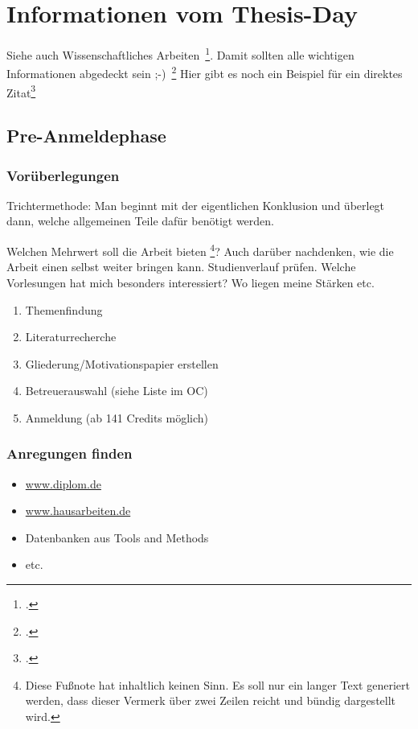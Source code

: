 \newpage
\section{Informationen vom Thesis-Day} \label{infos}
Siehe auch Wissenschaftliches Arbeiten~\footcite[\vglf][S. 1]{Balzert0.2008}. %
Damit sollten alle wichtigen Informationen abgedeckt sein ;-)~\footcite[\vglf][]{Balzert0.2008} %
Hier gibt es noch ein Beispiel für ein direktes Zitat\footcite[][]{Balzert0.2008} %

\subsection{Pre-Anmeldephase}
\subsubsection{Vorüberlegungen}
Trichtermethode: Man beginnt mit der eigentlichen  Konklusion und überlegt dann, welche allgemeinen Teile dafür benötigt werden.

Welchen Mehrwert soll die Arbeit bieten \footnote{Diese Fu\ss note hat inhaltlich keinen Sinn. Es soll nur ein langer Text generiert werden, dass dieser Vermerk über zwei Zeilen reicht und bündig dargestellt wird.}? Auch darüber nachdenken, wie die Arbeit einen selbst weiter bringen kann. Studienverlauf prüfen. Welche Vorlesungen hat mich besonders interessiert? Wo liegen meine Stärken etc.

\begin{enumerate}
\item Themenfindung
\item Literaturrecherche
\item Gliederung/Motivationspapier erstellen
\item Betreuerauswahl (siehe Liste im \ac{OC})
\item Anmeldung (ab 141 Credits möglich)
\end{enumerate}

\subsubsection{Anregungen finden}
\begin{itemize}
\item \href{http://www.diplom.de}{www.diplom.de}
\item \href{http://www.hausarbeiten.de}{www.hausarbeiten.de}
\item Datenbanken aus Tools and Methods
\item etc.
\end{itemize}

